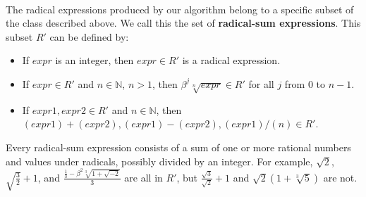 \documentclass{article}
\begin{document}
    \\
    The radical expressions produced by our algorithm belong to a specific subset of the class described above. We call this the set of \textbf{radical-sum expressions}. This subset $ R' $ can be defined by:
    \begin{itemize}
        \item If $ expr $ is an integer, then $ expr \in R' $ is a radical expression.
        \item If $ expr \in R' $ and $ n \in \mathbb{N} $, $ n > 1 $, then $ \beta^j \sqrt[n]{expr} \in R' $ for all $ j $ from $ 0 $ to $ n - 1 $.
        \item If $ expr1, expr2 \in R' $ and $ n \in \mathbb{N} $, then $ (expr1) + (expr2), (expr1) - (expr2), (expr1)/(n) \in R' $.
    \end{itemize}
    Every radical-sum expression consists of a sum of one or more rational numbers and values under radicals, possibly divided by an integer. For example, $ \sqrt{2} $, $ \sqrt{\frac{3}{2}} + 1 $, and $ \frac{\frac{1}{3} - \beta^2 \sqrt[3]{1 + \sqrt{-2}}}{3} $ are all in $ R' $, but $ \frac{\sqrt{3}}{\sqrt{2}} + 1 $ and $ \sqrt{2} (1 + \sqrt[3]{5}) $ are not.\\
\end{document}
